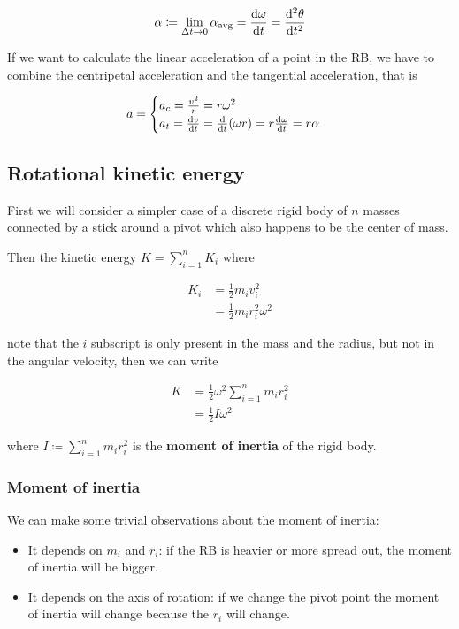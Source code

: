 \documentclass[12pt]{extarticle}
\begin{document}
\begin{equation}
    \alpha \coloneq \lim_{\Delta t \to 0} \alpha_{\text{avg}} = \dv{\omega}{t} = \dv[2]{\theta}{t}
\end{equation}

If we want to calculate the linear acceleration of a point in the RB, we have to combine the centripetal acceleration and the tangential acceleration, that is

$$
    a = \begin{cases}
        a_c = \frac{v^2}{r} = r\omega^2 \\
        a_t = \dv{v}{t} = \dv{t}(\omega r) = r \dv{\omega}{t} = r\alpha
    \end{cases}
$$

\subsection{Rotational kinetic energy}

First we will consider a simpler case of a discrete rigid body of $n$ masses connected by a stick around a pivot which also happens to be the center of mass.

Then the kinetic energy $K = \sum_{i=1}^n K_i$ where

\begin{align}
    K_i & = \frac{1}{2}m_i v_i^2          \\
        & = \frac{1}{2}m_i r_i^2 \omega^2
\end{align}

note that the $i$ subscript is only present in the mass and the radius, but not in the angular velocity, then we can write

\begin{align}
    K & = \frac{1}{2} \omega^2 \sum_{i=1}^n m_i r_i^2 \\
      & = \frac{1}{2} I \omega^2
\end{align}

where $I \coloneq \sum_{i=1}^n m_i r_i^2$ is the \textbf{moment of inertia} of the rigid body.

\subsubsection{Moment of inertia}

We can make some trivial observations about the moment of inertia:

\begin{itemize}
    \item It depends on $m_i$ and $r_i$: if the RB is heavier or more spread out, the moment of inertia will be bigger.
    \item It depends on the axis of rotation: if we change the pivot point the moment of inertia will change because the $r_i$ will change.
\end{itemize}
\end{document}
